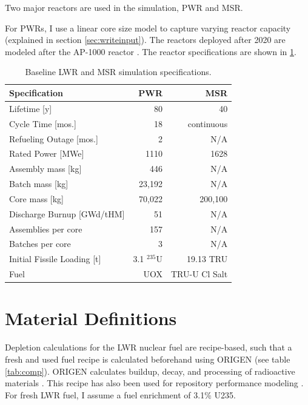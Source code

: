 Two major reactors are used in the simulation, \gls{PWR} and \gls{MSR}.

For \glspl{PWR}, I use a linear core size model to capture varying reactor capacity
(explained in section \ref{sec:writeinput}). The reactors deployed after 2020 are
modeled after the AP-1000 reactor \cite{sutharshan_ap1000tm_2011}. The reactor
specifications are shown in \ref{tab:us-reactor-specs}.

\begin{table}[h]
	\centering
	\caption{Baseline \gls{LWR} and \gls{MSR} simulation specifications.}
	\begin{tabular}{lrr}
		\hline
		\textbf{Specification} & \textbf{\gls{PWR} \cite{sutharshan_ap1000tm_2011}} & \textbf{\gls{MSR} \cite{mourogov_potentialities_2006}} \\
		\hline
		Lifetime [y]  & 80 & 40 \\
		Cycle Time [mos.]& 18 & continuous \\ 
		Refueling Outage [mos.]& 2 & N/A \\
		Rated Power [\gls{MWe}] & 1110 & 1628 \\
		Assembly mass [kg] & 446 & N/A \\
		Batch mass [kg] & 23,192 & N/A \\
		Core mass [kg] & 70,022 & 200,100 \\
		Discharge Burnup [GWd/tHM] & 51 & N/A \\
		Assemblies per core & 157  & N/A \\
		Batches per core & 3 & N/A \\
		Initial Fissile Loading [t] & 3.1  $^{235}$U & 19.13 \gls{TRU} \\
		Fuel & \gls{UOX} & \gls{TRU}-U Cl Salt \\
		\hline
	\end{tabular}
	\label{tab:us-reactor-specs}
\end{table}


\section{Material Definitions}
Depletion calculations for the \gls{LWR} nuclear fuel are recipe-based, such 
that a fresh and used fuel recipe is calculated beforehand using ORIGEN (see table \ref{tab:comp}).
ORIGEN calculates buildup, decay, and processing of radioactive materials
\cite{parks_overview_1992}. This recipe has also been used for
repository performance modeling \cite{wilson_adoption_2009}.
For fresh \gls{LWR} fuel, I assume a fuel enrichment of 3.1\% U235.

